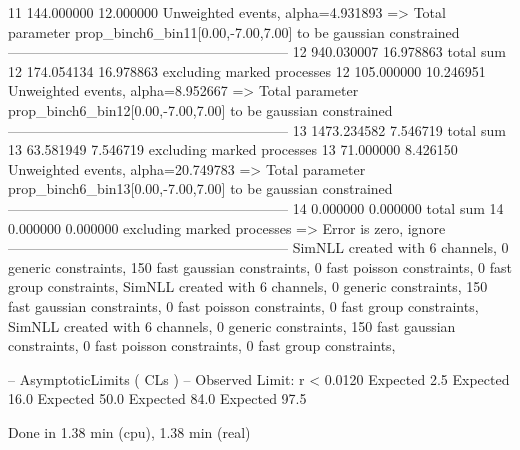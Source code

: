 11         144.000000      12.000000       Unweighted events, alpha=4.931893
  => Total parameter prop_binch6_bin11[0.00,-7.00,7.00] to be gaussian constrained
------------------------------------------------------------
12         940.030007      16.978863       total sum                     
12         174.054134      16.978863       excluding marked processes    
12         105.000000      10.246951       Unweighted events, alpha=8.952667
  => Total parameter prop_binch6_bin12[0.00,-7.00,7.00] to be gaussian constrained
------------------------------------------------------------
13         1473.234582     7.546719        total sum                     
13         63.581949       7.546719        excluding marked processes    
13         71.000000       8.426150        Unweighted events, alpha=20.749783
  => Total parameter prop_binch6_bin13[0.00,-7.00,7.00] to be gaussian constrained
------------------------------------------------------------
14         0.000000        0.000000        total sum                     
14         0.000000        0.000000        excluding marked processes    
  => Error is zero, ignore      
------------------------------------------------------------
SimNLL created with 6 channels, 0 generic constraints, 150 fast gaussian constraints, 0 fast poisson constraints, 0 fast group constraints, 
SimNLL created with 6 channels, 0 generic constraints, 150 fast gaussian constraints, 0 fast poisson constraints, 0 fast group constraints, 
SimNLL created with 6 channels, 0 generic constraints, 150 fast gaussian constraints, 0 fast poisson constraints, 0 fast group constraints, 

 -- AsymptoticLimits ( CLs ) --
Observed Limit: r < 0.0120
Expected  2.5%
Expected 16.0%
Expected 50.0%
Expected 84.0%
Expected 97.5%

Done in 1.38 min (cpu), 1.38 min (real)
